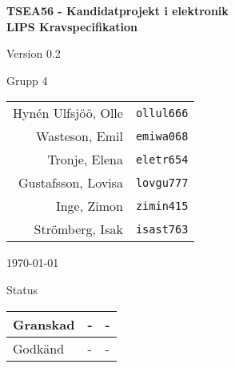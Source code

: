 \documentclass[11pt]{article}
\begin{document}
\begin{titlepage}
\begin{center}

{\Large\bfseries TSEA56 - Kandidatprojekt i elektronik \\ LIPS Kravspecifikation}

\vspace{5em}

Version 0.2

\vspace{5em}
%
Grupp 4 \\
\begin{tabular}{rl}
Hynén Ulfsjöö, Olle&\verb+ollul666+
\\
Wasteson, Emil&\verb+emiwa068+
\\
Tronje, Elena&\verb+eletr654+
\\
Gustafsson, Lovisa&\verb+lovgu777+
\\
Inge, Zimon&\verb+zimin415+
\\
Strömberg, Isak&\verb+isast763+
\\
\end{tabular}

\vspace{5em}
\today

\vspace{18em}
Status
\begin{longtable}{|l|l|l|} \hline

Granskad & - & - \\ \hline
Godkänd & - & - \\ \hline
 
\end{longtable}

\end{center}
\end{titlepage}
\end{document}
